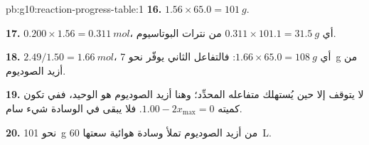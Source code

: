\begin{solution}{pb:g10:reaction-progress-table:1}
\textbf{16.} $1.56 \times 65.0 = \qty{101}{g}$.

\textbf{17.} $0.200 \times 1.56 = \qty{0.311}{mol}$، أي
$0.311 \times 101.1 = \qty{31.5}{g}$ من نترات البوتاسيوم.

\textbf{18.} $2.49 / 1.50 = \qty{1.66}{mol}$، أي
$1.66 \times 65.0 = \qty{108}{g}$: فالتفاعل الثاني يوفّر نحو
\qty{7}{g} من أزيد الصوديوم.

\textbf{19.}  لا يتوقف إلا حين يُستهلك متفاعله المحدِّد؛ وهنا أزيد
الصوديوم هو  الوحيد، ففي  تكون كميته
$1.00 - 2x_{\max} = 0$. فلا يبقى في الوسادة شيء سام.

\textbf{20.} نحو \qty{101}{g} من أزيد الصوديوم تملأ وسادة هوائية سعتها
\qty{60}{L}.
\end{solution}
